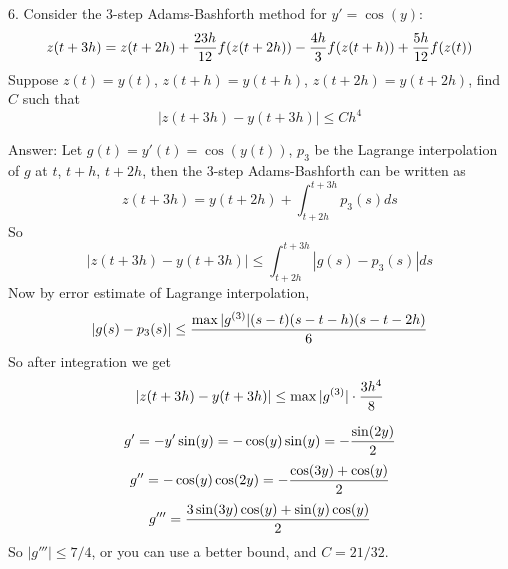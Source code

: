 \documentclass[20pt]{article} %
\theoremstyle{break}
\begin{document}
6. Consider the 3-step Adams-Bashforth method for $y'=\cos(y)$:
\[z(t+3h)=z(t+2h)+{23h\over 12}f(z(t+2h))-{4h\over 3}f(z(t+h))+{5h\over 12}f(z(t))\]
Suppose $z(t)=y(t)$, $z(t+h)=y(t+h)$, $z(t+2h)=y(t+2h)$, find $C$ such that
\[|z(t+3h)-y(t+3h)|\leq Ch^4\]

Answer: Let $g(t)=y'(t)=\cos(y(t))$, $p_3$ be the Lagrange interpolation of $g$ at $t$, $t+h$, $t+2h$, then the 3-step Adams-Bashforth can be written as
\[z(t+3h)=y(t+2h)+\int_{t+2h}^{t+3h}p_3(s)ds\]
So
\[|z(t+3h)-y(t+3h)|\leq \int_{t+2h}^{t+3h}|g(s)-p_3(s)|ds\]
Now by error estimate of Lagrange interpolation,
\[|g(s)-p_3(s)|\leq{\max|g^{(3)}|(s-t)(s-t-h)(s-t-2h)\over 6}\]
So after integration we get
\[|z(t+3h)-y(t+3h)|\leq \max|g^{(3)}|\cdot{3h^4\over 8}\]

\[g'=-y'\sin(y)=-\cos(y)\sin(y)=-{\sin(2y)\over 2}\]
\[g''=-\cos(y)\cos(2y)=-{\cos(3y)+\cos(y)\over 2}\]
\[g'''={3\sin(3y)\cos(y)+\sin(y)\cos(y)\over 2}\]
So $|g'''|\leq 7/4$, or you can use a better bound, and $C=21/32$.
\end{document}
